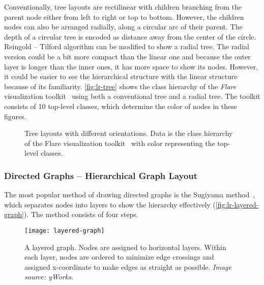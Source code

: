 Conventionally, tree layouts are rectilinear with children branching from the parent node either from left to right or top to bottom. However, the children nodes can also be arranged radially, along a circular arc of their parent. The depth of a circular tree is encoded as distance away from the center of the circle. Reingold -- Tilford algorithm can be modified to show a radial tree. The radial version could be a bit more compact than the linear one and because the outer layer is longer than the inner ones, it has more space to show its nodes. However, it could be easier to see the hierarchical structure with the linear structure because of its familiarity. \autoref{fig:lr-tree} shows the class hierarchy of the \emph{Flare} visualization toolkit~\cite{Heer2009b} using both a conventional tree and a radial tree. The toolkit consists of 10 top-level classes, which determine the color of nodes in these figures.

\begin{figure}[!htb]
\centering
{}
\hfill
{}
\caption{Tree layouts with different orientations. Data is the class hierarchy of the Flare visualization toolkit~\cite{Heer2009b} with color representing the top-level classes.}
\label{fig:lr-tree}
\end{figure}
  
\subsubsection{Directed Graphs -- Hierarchical Graph Layout}	
The most popular method of drawing directed graphs is the Sugiyama method~\cite{Sugiyama1981}, which separates nodes into layers to show the hierarchy effectively (\autoref{fig:lr-layered-graph}). The method consists of four steps.

\begin{figure}[!htb]
	\centering
	\texttt{[image: layered-graph]}
	\caption{A layered graph. Nodes are assigned to horizontal layers. Within each layer, nodes are ordered to minimize edge crossings and assigned x-coordinate to make edges as straight as possible. \textrm{\emph{Image source: yWorks.}}}
	\label{fig:lr-layered-graph}
\end{figure}

